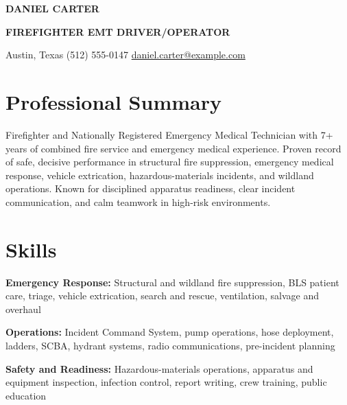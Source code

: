 \documentclass[10pt,letterpaper]{article}
\newcommand{\skillline}[2]{%
  \textbf{#1:} #2\par
}
\begin{document}
\begin{center}
  {\fontsize{23}{25}\selectfont\bfseries DANIEL CARTER}\par
  \vspace{0.12em}
  {\large\bfseries\color{FireRed} FIREFIGHTER \textbar{} EMT \textbar{} DRIVER/OPERATOR}\par
  \vspace{0.28em}
  Austin, Texas \enspace\textbar\enspace (512) 555-0147
  \enspace\textbar\enspace
  \href{mailto:daniel.carter@example.com}{daniel.carter@example.com}
\end{center}

\vspace{-0.45em}

\section*{Professional Summary}
Firefighter and Nationally Registered Emergency Medical Technician with 7+ years of
combined fire service and emergency medical experience. Proven record of safe,
decisive performance in structural fire suppression, emergency medical response,
vehicle extrication, hazardous-materials incidents, and wildland operations. Known
for disciplined apparatus readiness, clear incident communication, and calm teamwork
in high-risk environments.

\section*{Skills}
\skillline{Emergency Response}{Structural and wildland fire suppression, BLS patient care, triage, vehicle extrication, search and rescue, ventilation, salvage and overhaul}
\skillline{Operations}{Incident Command System, pump operations, hose deployment, ladders, SCBA, hydrant systems, radio communications, pre-incident planning}
\skillline{Safety and Readiness}{Hazardous-materials operations, apparatus and equipment inspection, infection control, report writing, crew training, public education}

\end{document}
